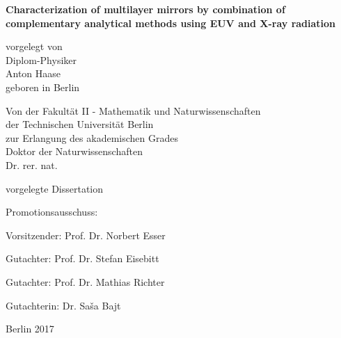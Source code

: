 
\begin{titlepage}
{\noindent\sffamily\large%
    \begin{center}
        \vspace*{3ex}
        {\LARGE\bfseries\sffamily
           Characterization of multilayer mirrors by combination of complementary analytical methods using EUV and X-ray radiation
        }
        \vspace{1cm}

        vorgelegt von \\
        Diplom-Physiker \\
        Anton Haase \\
        geboren in Berlin \\
        \vspace{4cm}

        Von der Fakultät II - Mathematik und Naturwissenschaften \\
        der Technischen Universität Berlin \\
        zur Erlangung des akademischen Grades \\
        Doktor der Naturwissenschaften \\
        Dr. rer. nat. \\
        \vspace{3ex}

        vorgelegte Dissertation \\
        \vspace{2cm}
    \end{center}

    Promotionsausschuss:
    \vspace{2ex}

    Vorsitzender: Prof. Dr. Norbert Esser

    Gutachter: Prof. Dr. Stefan Eisebitt

    Gutachter: Prof. Dr. Mathias Richter

    Gutachterin: Dr. Sa\v{s}a Bajt
    \vspace{1ex}


    \begin{center}
        Berlin 2017
    \end{center}
}
\end{titlepage}

\cleardoublepage

